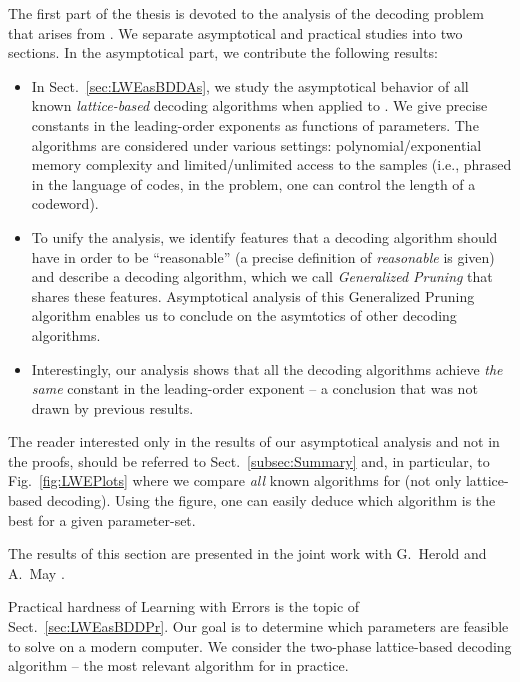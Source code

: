 The first part of the thesis is devoted to the analysis of the decoding problem that arises from \LWE. We separate asymptotical and practical studies into two sections.
In the asymptotical part, we contribute the following results:

	\begin{itemize}
		\item In Sect.~\ref{sec:LWEasBDDAs}, we study the asymptotical behavior of all known \emph{lattice-based} decoding algorithms when applied to \LWE.
		We give precise constants in the leading-order exponents as functions of \LWE parameters. The algorithms are considered under various settings: polynomial/exponential memory complexity and limited/unlimited access to the \LWE samples (i.e., phrased in the language of codes, in the \LWE problem, one can control the length of a codeword).
		\item To unify the analysis, we identify features that a decoding algorithm should have in order to be ``reasonable'' (a precise definition of \emph{reasonable} is given) and describe a decoding algorithm, which we call \emph{Generalized Pruning} that shares these features. Asymptotical analysis of this Generalized Pruning algorithm enables us to conclude on the asymtotics of other decoding algorithms.
		\item  Interestingly, our analysis shows that all the decoding algorithms achieve \emph{the same} constant in the leading-order exponent -- a conclusion that was not drawn by previous results. 
	\end{itemize} 
	
The reader interested only in the results of our asymptotical analysis and not in the proofs, should be referred to Sect.~\ref{subsec:Summary} and, in particular, to Fig.~\ref{fig:LWEPlots} where we compare \emph{all} known algorithms for \LWE (not only lattice-based decoding). Using the figure, one can easily deduce which algorithm is the best for a given \LWE parameter-set. 

The results of this section are presented in the joint work with G.\ Herold and A.\ May \cite{DCC:HKM}.

\vspace{10pt}

Practical hardness of Learning with Errors is the topic of Sect.~\ref{sec:LWEasBDDPr}. Our goal is to determine which \LWE parameters are feasible to solve on a modern computer. We consider the two-phase lattice-based decoding algorithm -- the most relevant algorithm for \LWE in practice.

